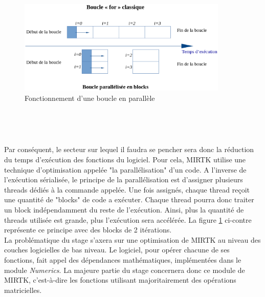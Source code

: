 \documentclass[10pt]{report}
\begin{document}
	\begin{figure}
		\includegraphics[width=10cm]{Reports/figures/gfor.eps}	
		\caption{Fonctionnement d'une boucle en parallèle}
		\label{Fonctionnement d'une boucle en parallèle}
	\end{figure}
	
	~\par~\par
	Par conséquent, le secteur sur lequel il faudra se pencher sera donc la réduction du temps d'exécution des fonctions du logiciel. Pour cela, MIRTK utilise une technique d'optimisation appelée "la parallélisation" d'un code. A l'inverse de l'exécution sérialisée, le principe de la parallélisation est d'assigner plusieurs threads dédiés à la commande appelée. Une fois assignés, chaque thread reçoit une quantité de "blocks" de code a exécuter. Chaque thread pourra donc traiter un block indépendamment du reste de l'exécution. Ainsi, plus la quantité de threads utilisée est grande, plus l'exécution sera accélérée. La figure \ref{Fonctionnement d'une boucle en parallèle} ci-contre représente ce principe avec des blocks de 2 itérations.\\

	La problématique du stage s'axera sur une optimisation de MIRTK au niveau des couches logicielles de bas niveau. Le logiciel, pour opérer chacune de ses fonctions, fait appel des dépendances mathématiques, implémentées dans le module \textit{Numerics}. La majeure partie du stage concernera donc ce module de MIRTK, c'est-à-dire les fonctions utilisant majoritairement des opérations matricielles.\\
	
\end{document}
